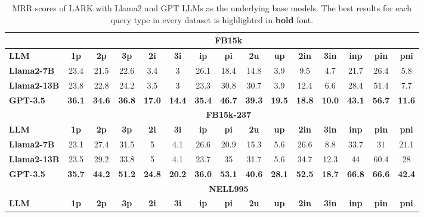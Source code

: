 \documentclass{article} %
\newcommand{\model}{LARK}
\begin{document}
\begin{table}[htbp]
\centering
\small
\vspace{-2em}
\setlength{\tabcolsep}{3pt}
\caption{MRR scores of {\model} with Llama2 and GPT LLMs as the underlying base models. {The best results for each query type in every dataset is highlighted in \textbf{bold} font.}}
\vspace{-1em}
\begin{tabular}{l|ccccccccc|ccccc}
\hline
& \multicolumn{13}{c}{\textbf{FB15k}}\\\hline
 \textbf{LLM}            & \textbf{1p}         & \textbf{2p}   & \textbf{3p}   & \textbf{2i}   & \textbf{3i}   & \textbf{ip}   & \textbf{pi}   & \textbf{2u}   & \textbf{up}   & \textbf{2in} & \textbf{3in} & \textbf{inp}  & \textbf{pin}  & \textbf{pni} \\\hline
\textbf{Llama2-7B}   &23.4&21.5&22.6&3.4&3&26.1&18.4&14.8&3.9&9.5&4.7&21.7&26.4&5.8\\
\textbf{Llama2-13B}   & 23.8&22.8&24.2&3.5&3&23.3&30.8&30.7&3.9&12.4&6.6&28.4&51.4&7.7\\
\textbf{GPT-3.5}  &\textbf{36.1}&\textbf{34.6}&\textbf{36.8}&\textbf{17.0}&\textbf{14.4}&\textbf{35.4}&\textbf{46.7}&\textbf{39.3}&\textbf{19.5}&\textbf{18.8}&\textbf{10.0}&\textbf{43.1}&\textbf{56.7}&\textbf{11.6}  \\\hline
& \multicolumn{13}{c}{\textbf{FB15k-237}}\\\hline
 \textbf{LLM}            & \textbf{1p}         & \textbf{2p}   & \textbf{3p}   & \textbf{2i}   & \textbf{3i}   & \textbf{ip}   & \textbf{pi}   & \textbf{2u}   & \textbf{up}   & \textbf{2in} & \textbf{3in} & \textbf{inp}  & \textbf{pin}  & \textbf{pni} \\\hline
\textbf{Llama2-7B}   &23.1&27.4&31.5&5&4.1&26.6&20.9&15.3&5.6&26.6&8.8&33.7&31&21.1\\
\textbf{Llama2-13B}   & 23.5&29.2&33.8&5&4.1&23.7&35&31.7&5.6&34.7&12.3&44&60.4&28\\
\textbf{GPT-3.5}  & \textbf{35.7}&\textbf{44.2}&\textbf{51.2}&\textbf{24.8}&\textbf{20.2}&\textbf{36.0}&\textbf{53.1}&\textbf{40.6}&\textbf{28.1}&\textbf{52.5}&\textbf{18.7}&\textbf{66.8}&\textbf{66.6}&\textbf{42.4} \\\hline
& \multicolumn{13}{c}{\textbf{NELL995}}\\\hline
 \textbf{LLM}            & \textbf{1p}         & \textbf{2p}   & \textbf{3p}   & \textbf{2i}   & \textbf{3i}   & \textbf{ip}   & \textbf{pi}   & \textbf{2u}   & \textbf{up}   & \textbf{2in} & \textbf{3in} & \textbf{inp}  & \textbf{pin}  & \textbf{pni} \\\hline

\end{tabular}
\end{table}
\end{document}
